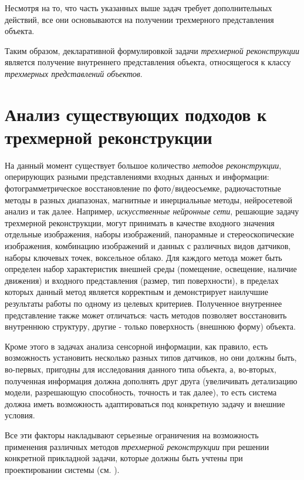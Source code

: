 Несмотря на то, что часть указанных выше задач требует дополнительных действий, все они основываются на получении трехмерного представления объекта.

Таким образом, декларативной формулировкой задачи \textit{трехмерной реконструкции} является получение внутреннего представления объекта, относящегося к классу \textit{трехмерных представлений объектов}.

\section{Анализ существующих подходов к трехмерной реконструкции}
\label{sec_3d_models_analysis}

На данный момент существует большое количество \textit{методов реконструкции}, оперирующих разными представлениями входных данных и информации: фотограмметрическое восстановление по фото/видеосъемке, радиочастотные методы в разных диапазонах, магнитные и инерциальные методы, нейросетевой анализ и так далее. Например, \textit{искусственные нейронные сети}, решающие задачу трехмерной реконструкции, могут принимать в качестве входного значения отдельные изображения, наборы изображений, панорамные и стереоскопические изображения, комбинацию изображений и данных с различных видов датчиков, наборы ключевых точек, воксельное облако. Для каждого метода может быть определен набор характеристик внешней среды (помещение, освещение, наличие движения) и входного представления (размер, тип поверхности), в пределах которых данный метод является корректным и демонстрирует наилучшие результаты работы по одному из целевых критериев. Полученное внутреннее представление также может отличаться: часть методов позволяет восстановить внутреннюю структуру, другие - только поверхность (внешнюю форму) объекта.

Кроме этого в задачах анализа сенсорной информации, как правило, есть возможность установить несколько разных типов датчиков, но они должны быть, во-первых, пригодны для исследования данного типа объекта, а, во-вторых, полученная информация должна дополнять друг друга (увеличивать детализацию модели, разрешающую способность, точность и так далее), то есть система должна иметь возможность адаптироваться под конкретную задачу и внешние условия.

Все эти факторы накладывают серьезные ограничения на возможность применения различных методов \textit{трехмерной реконструкции} при решении конкретной прикладной задачи, которые должны быть учтены при проектировании системы (см. ).

